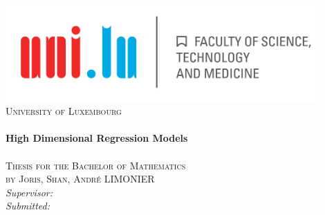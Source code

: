 \begin{titlepage}
	\begin{center}
		\includegraphics[width=0.9\textwidth]{images/logo.png}\\[.4cm]
		\textsc{\LARGE University of Luxembourg}\\[2cm]
		\vspace{1.8cm}
		\HRule \\[0.7cm]
		
		{ \Huge \bfseries High Dimensional Regression Models}\\[0.4cm]
		
		\HRule \\[3.5cm]
		
		
		\textsc{\Large Thesis for the Bachelor of Mathematics}\\[.7cm]
		\textsc{\Large by  } \textsc{\Huge Joris, Shan, André LIMONIER}\\ %
		
		\vfill
		\emph{Supervisor:}  \\[.2cm]
		\emph{Submitted:} 
	\end{center}
\end{titlepage}

